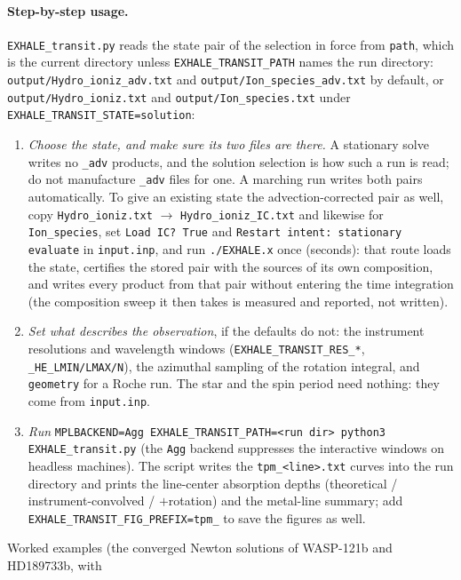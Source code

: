 \documentclass[english,a4paper]{my_memo}
\begin{document}
\paragraph{Step-by-step usage.} \texttt{EXHALE\_transit.py} reads the state
pair of the selection in force from \texttt{path}, which is the current
directory unless \texttt{EXHALE\_TRANSIT\_PATH} names the run directory:
\texttt{output/Hydro\_ioniz\_adv.txt} and
\texttt{output/Ion\_species\_adv.txt} by default, or
\texttt{output/Hydro\_ioniz.txt} and \texttt{output/Ion\_species.txt} under
\texttt{EXHALE\_TRANSIT\_STATE=solution}:
\begin{enumerate}
\item \emph{Choose the state, and make sure its two files are there.} A
  stationary solve writes no \texttt{\_adv} products, and the solution
  selection is how such a run is read; do not manufacture \texttt{\_adv}
  files for one. A marching run writes both pairs automatically. To give an
  existing state the advection-corrected pair as well, copy
  \texttt{Hydro\_ioniz.txt} $\to$ \texttt{Hydro\_ioniz\_IC.txt} and likewise
  for \texttt{Ion\_species}, set \texttt{Load IC?\ True} and
  \texttt{Restart intent: stationary evaluate} in \texttt{input.inp}, and run
  \texttt{./EXHALE.x} once (seconds): that route loads the state, certifies
  the stored pair with the sources of its own composition, and writes every
  product from that pair without entering the time integration (the
  composition sweep it then takes is measured and reported, not written).
\item \emph{Set what describes the observation}, if the defaults do not: the
  instrument resolutions and wavelength windows
  (\texttt{EXHALE\_TRANSIT\_RES\_*}, \texttt{\_HE\_LMIN/LMAX/N}), the azimuthal
  sampling of the rotation integral, and \texttt{geometry} for a Roche run.
  The star and the spin period need nothing: they come from
  \texttt{input.inp}.
\item \emph{Run} \texttt{MPLBACKEND=Agg EXHALE\_TRANSIT\_PATH=<run dir> python3
  EXHALE\_transit.py} (the \texttt{Agg} backend suppresses the interactive
  windows on headless machines). The script writes the \texttt{tpm\_<line>.txt}
  curves into the run directory and prints the line-center absorption depths
  (theoretical / instrument-convolved / $+$rotation) and the metal-line summary;
  add \texttt{EXHALE\_TRANSIT\_FIG\_PREFIX=tpm\_} to save the figures as well.
\end{enumerate}
Worked examples (the converged Newton solutions of WASP-121b and HD189733b, with
\end{document}
